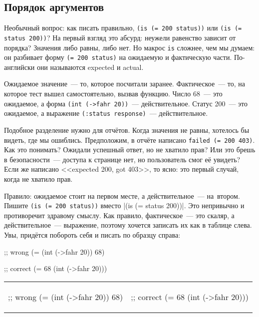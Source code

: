 \subsection{Порядок аргументов}


Необычный вопрос: как писать правильно, \verb|(is (= 200 status))| или
\verb|(is (= status 200))|? На первый взгляд это абсурд: неужели равенство
зависит от порядка? Значения либо равны, либо нет. Но макрос \verb|is|
сложнее, чем мы думаем: он разбивает форму \verb|(= 200 status)| на ожидаемую
и фактическую части. По-английски они называются expected и actual.

Ожидаемое значение~--- то, которое посчитали заранее. Фактическое~--- то, на
которое тест вышел самостоятельно, вызвав функцию. Число 68~--- это ожидаемое, а
форма \verb|(int (->fahr 20))|~--- действительное. Статус 200~--- это ожидаемое,
а выражение \verb|(:status response)|~--- действительное.

Подобное разделение нужно для отчётов. Когда значения не равны, хотелось бы
видеть, где мы ошиблись. Предположим, в отчёте написано
\verb|failed (= 200 403)|. Как это понимать? Ожидали успешный ответ, но не
хватило прав? Или это брешь в безопасности~--- доступа к странице нет, но
пользователь смог её увидеть? Если же написано <<expected 200, got 403>>, то
ясно: это первый случай, когда не хватило прав.

Правило: ожидаемое стоит на первом месте, а действительное~--- на~втором. Пишите
\verb|(is (= 200 status))| вместо \spverb|(is (= status 200))|.  Это непривычно
и противоречит здравому смыслу. Как правило, фактическое~--- это скаляр, а
действительное~--- выражение, поэтому хочется записать их как в таблице слева.
Увы, придётся побороть себя и писать по образцу справа:

\ifnarrow

\begin{english}
  \begin{clojure}
;; wrong
(= (int (->fahr 20)) 68)
  \end{clojure}

\splitter

  \begin{clojure}
;; correct
(= 68 (int (->fahr 20)))
  \end{clojure}
\end{english}

\else

\begin{english}

\noindent
\begin{tabular}{ @{}p{5cm} @{}p{5cm} }

  \begin{clojure}
;; wrong
(= (int (->fahr 20)) 68)
  \end{clojure}

&

  \begin{clojure}
;; correct
(= 68 (int (->fahr 20)))
  \end{clojure}

\end{tabular}

\end{english}

